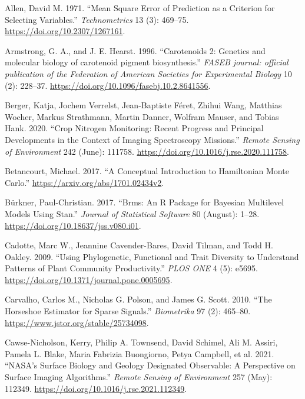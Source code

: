\documentclass[
  letterpaper,
  DIV=11,
  numbers=noendperiod]{scrartcl}
\newlength{\cslhangindent}
\newlength{\cslentryspacingunit} %
\newenvironment{CSLReferences}[2] %
 {%
  \setlength{\parindent}{0pt}
  \ifodd #1
  \let\oldpar\par
  \def\par{\hangindent=\cslhangindent\oldpar}
  \fi
  \setlength{\parskip}{#2\cslentryspacingunit}
 }%
 {}
\begin{document}
\hypertarget{refs}{}
\begin{CSLReferences}{1}{0}
\leavevmode{}%
Allen, David M. 1971. {``Mean Square Error of Prediction as a Criterion
for Selecting Variables.''} \emph{Technometrics} 13 (3): 469--75.
\url{https://doi.org/10.2307/1267161}.

\leavevmode{}%
Armstrong, G. A., and J. E. Hearst. 1996. {``Carotenoids 2: Genetics and
molecular biology of carotenoid pigment biosynthesis.''} \emph{FASEB
journal: official publication of the Federation of American Societies
for Experimental Biology} 10 (2): 228--37.
\url{https://doi.org/10.1096/fasebj.10.2.8641556}.

\leavevmode{}%
Berger, Katja, Jochem Verrelst, Jean-Baptiste Féret, Zhihui Wang,
Matthias Wocher, Markus Strathmann, Martin Danner, Wolfram Mauser, and
Tobias Hank. 2020. {``Crop Nitrogen Monitoring: Recent Progress and
Principal Developments in the Context of Imaging Spectroscopy
Missions.''} \emph{Remote Sensing of Environment} 242 (June): 111758.
\url{https://doi.org/10.1016/j.rse.2020.111758}.

\leavevmode{}%
Betancourt, Michael. 2017. {``A Conceptual Introduction to Hamiltonian
Monte Carlo.''} \url{https://arxiv.org/abs/1701.02434v2}.

\leavevmode{}%
Bürkner, Paul-Christian. 2017. {``Brms: An R Package for Bayesian
Multilevel Models Using Stan.''} \emph{Journal of Statistical Software}
80 (August): 1--28. \url{https://doi.org/10.18637/jss.v080.i01}.

\leavevmode{}%
Cadotte, Marc W., Jeannine Cavender-Bares, David Tilman, and Todd H.
Oakley. 2009. {``Using Phylogenetic, Functional and Trait Diversity to
Understand Patterns of Plant Community Productivity.''} \emph{PLOS ONE}
4 (5): e5695. \url{https://doi.org/10.1371/journal.pone.0005695}.

\leavevmode{}%
Carvalho, Carlos M., Nicholas G. Polson, and James G. Scott. 2010.
{``The Horseshoe Estimator for Sparse Signals.''} \emph{Biometrika} 97
(2): 465--80. \url{https://www.jstor.org/stable/25734098}.

\leavevmode{}%
Cawse-Nicholson, Kerry, Philip A. Townsend, David Schimel, Ali M.
Assiri, Pamela L. Blake, Maria Fabrizia Buongiorno, Petya Campbell, et
al. 2021. {``NASA's Surface Biology and Geology Designated Observable: A
Perspective on Surface Imaging Algorithms.''} \emph{Remote Sensing of
Environment} 257 (May): 112349.
\url{https://doi.org/10.1016/j.rse.2021.112349}.


\end{CSLReferences}
\end{document}
